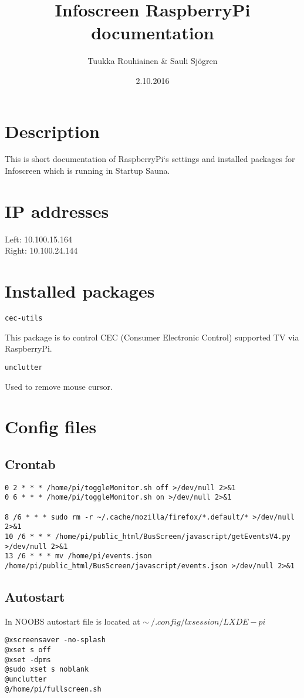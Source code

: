 \documentclass{article}
\title{Infoscreen RaspberryPi documentation}
\author{Tuukka Rouhiainen \& Sauli Sjögren}
\begin{document}
\date{2.10.2016}
\maketitle
\thispagestyle{fancy}

\section{Description}
This is short documentation of RaspberryPi`s settings and installed packages for Infoscreen which is running in Startup Sauna.
\section{IP addresses}
Left: 10.100.15.164 \\
Right: 10.100.24.144
\section{Installed packages}
\begin{verbatim}
cec-utils
\end{verbatim}
This package is to control CEC (Consumer Electronic Control) supported TV via RaspberryPi.
\begin{verbatim}
unclutter
\end{verbatim}
Used to remove mouse cursor.
\section{Config files}
\subsection{Crontab}
\begin{verbatim}
0 2 * * * /home/pi/toggleMonitor.sh off >/dev/null 2>&1
0 6 * * * /home/pi/toggleMonitor.sh on >/dev/null 2>&1

8 /6 * * * sudo rm -r ~/.cache/mozilla/firefox/*.default/* >/dev/null 2>&1
10 /6 * * * /home/pi/public_html/BusScreen/javascript/getEventsV4.py >/dev/null 2>&1
13 /6 * * * mv /home/pi/events.json /home/pi/public_html/BusScreen/javascript/events.json >/dev/null 2>&1
\end{verbatim}
\subsection{Autostart}
In NOOBS autostart file is located at $\sim~/.config/lxsession/LXDE-pi$
\begin{verbatim}
@xscreensaver -no-splash
@xset s off
@xset -dpms
@sudo xset s noblank
@unclutter
@/home/pi/fullscreen.sh
\end{verbatim}
\end{document}
